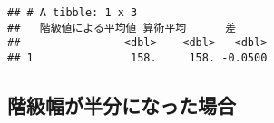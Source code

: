 \documentclass[
  12pt,
]{book}
\newenvironment{Shaded}{\begin{snugshade}}{\end{snugshade}}
\newcommand{\AttributeTok}[1]{\textcolor[rgb]{0.77,0.63,0.00}{#1}}
\newcommand{\FunctionTok}[1]{\textcolor[rgb]{0.00,0.00,0.00}{#1}}
\newcommand{\NormalTok}[1]{#1}
\newcommand{\OtherTok}[1]{\textcolor[rgb]{0.56,0.35,0.01}{#1}}
\newcommand{\SpecialCharTok}[1]{\textcolor[rgb]{0.00,0.00,0.00}{#1}}
\newcommand{\StringTok}[1]{\textcolor[rgb]{0.31,0.60,0.02}{#1}}
\begin{document}
\begin{Shaded}
\end{Shaded}

\begin{verbatim}
## # A tibble: 1 x 3
##   階級値による平均値 算術平均      差
##                <dbl>    <dbl>   <dbl>
## 1               158.     158. -0.0500
\end{verbatim}

\hypertarget{ux968eux7d1aux5e45ux304cux534aux5206ux306bux306aux3063ux305fux5834ux5408}{%
\subsection*{階級幅が半分になった場合}\label{ux968eux7d1aux5e45ux304cux534aux5206ux306bux306aux3063ux305fux5834ux5408}}
\end{document}
